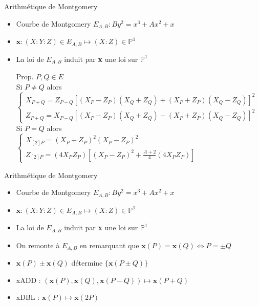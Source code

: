 \documentclass{beamer}
\begin{document}
\newcommand{\x}{\textbf{x}}
\begin{frame}{Arithmétique de Montgomery}
	\begin{itemize}
		\item{ Courbe de Montgomery $E_{A,B} : By^2 = x^3+Ax^2 + x$}
		\item{ $\x\colon (X:Y:Z) \in E_{A,B} \mapsto (X:Z) \in \mathbb{P}^1$}
		\item{La loi de $E_{A,B}$ induit par {\x} une loi sur $\mathbb{P}^1$}
	 \vspace*{0.5cm}
		\item[Prop.]{$P,Q\in E$\\ \hspace{-20pt}
			Si $P\neq Q$ alors\\
			{\small$\left\{\begin{array}{l}
					X_{P+Q} = Z_{P-Q}[(X_P-Z_P)(X_Q+Z_Q) + (X_P+Z_P)(X_Q-Z_Q)]^2\\
					Z_{P+Q} = X_{P-Q}[(X_P-Z_P)(X_Q+Z_Q) - (X_P+Z_P)(X_Q-Z_Q)]^2
				\end{array}\right.$}\\ \hspace{-20pt}
			Si $P=Q$ alors\\
			{\small$\left\{\begin{array}{l}
					X_{[2]P}=(X_P + Z_P)^2(X_P - Z_P)^2 \\
					Z_{[2]P}=(4 X_P Z_P)[(X_P - Z_P)^2 + \frac{A+2}{4}(4 X_P Z_P)]
				\end{array}\right.$}}
\end{itemize}\end{frame}

\begin{frame}{Arithmétique de Montgomery}
	\begin{itemize}
		\item{ Courbe de Montgomery $E_{A,B} : By^2 = x^3+Ax^2 + x$}
		\item{ $\x\colon (X:Y:Z) \in E_{A,B} \mapsto (X:Z) \in \mathbb{P}^1$}
		\item{La loi de $E_{A,B}$ induit par {\x} une loi sur $\mathbb{P}^1$}
	 \vspace*{0.5cm}
		\item{On remonte à $E_{A,B}$ en remarquant que $\x(P)=\x(Q)\Leftrightarrow P=\pm Q$}
		\item{ $\x(P)\pm\x(Q)$ détermine $\lbrace\x(P \pm Q)\rbrace$}
		\item{xADD : $(\x(P),\x(Q), \x(P-Q)) \mapsto \x(P+Q)$}
		\item{xDBL : $\x(P) \mapsto \x(2P)$}
	\end{itemize}
\end{frame}
\end{document}
